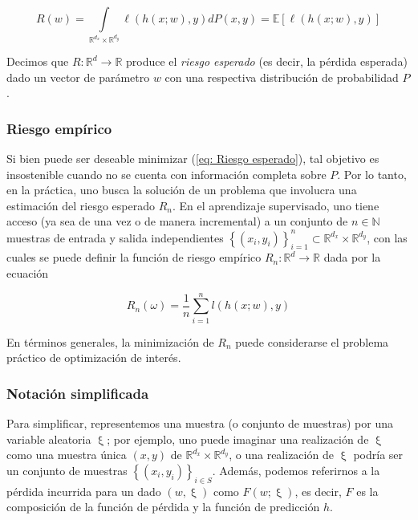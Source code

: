 \begin{equation}
\label{eq: Riesgo esperado}
R(w) = \int\limits_{\mathbb{R}^{d_x}\times \mathbb{R}^{d_y}} {\ell \left(h(x;w), y\right) dP(x,y)} = \mathbb{E} \left[ \ell \left( h(x;w), y \right) \right]
\end{equation}

Decimos que $R : \mathbb{R}^{d} \rightarrow \mathbb{R}$ produce el \textit{riesgo esperado} (es decir, la p\'erdida esperada) dado un vector de par\'ametro $w$ con una respectiva distribuci\'on de probabilidad $P$.

\subsubsection{Riesgo emp\'irico}
Si bien puede ser deseable minimizar (\ref{eq: Riesgo esperado}), tal objetivo es insostenible cuando no se cuenta con informaci\'on completa sobre $P$. Por lo tanto, en la pr\'actica, uno busca la soluci\'on de un problema que involucra una estimaci\'on del riesgo esperado $R_n$. En el aprendizaje supervisado, uno tiene acceso (ya sea de una vez o de manera incremental) a un conjunto de  $n \in \mathbb{N}$ muestras de entrada y salida independientes $\left\lbrace (x_i, y_i) \right\rbrace_{i=1}^{n} \subset \mathbb{R}^{d_x} \times \mathbb{R}^{d_y}$, con las cuales se puede definir la funci\'on de riesgo emp\'irico $R_n : \mathbb{R}^d \rightarrow \mathbb{R}$ dada por la ecuaci\'on 

\begin{equation}
\label{eq: Riesgo empirico}
R_n(\omega) = \frac{1}{n} \sum\limits_{i=1}^{n} {l \left( h(x;w), y\right)}
\end{equation}

En t\'erminos generales, la minimizaci\'on de $R_n$ puede considerarse el problema pr\'actico de optimizaci\'on de inter\'es. 

\subsubsection{Notaci\'on simplificada}
Para simplificar, representemos una muestra (o conjunto de muestras) por una variable aleatoria $\upxi$; por ejemplo, uno puede imaginar una realizaci\'on de $\upxi$ como una muestra \'unica $(x, y)$ de $\mathbb{R}^{d_x} \times \mathbb{R}^{d_y}$, o una realizaci\'on de $\upxi$ podr\'ia ser un conjunto de muestras $\left\lbrace(x_i, y_i)\right\rbrace_{i \in S}$. Adem\'as, podemos referirnos a la p\'erdida incurrida para un dado $(w, \upxi)$ como $F(w; \upxi )$, es decir, $F$ es la composici\'on de la funci\'on de p\'erdida y la funci\'on de predicci\'on $h$.

